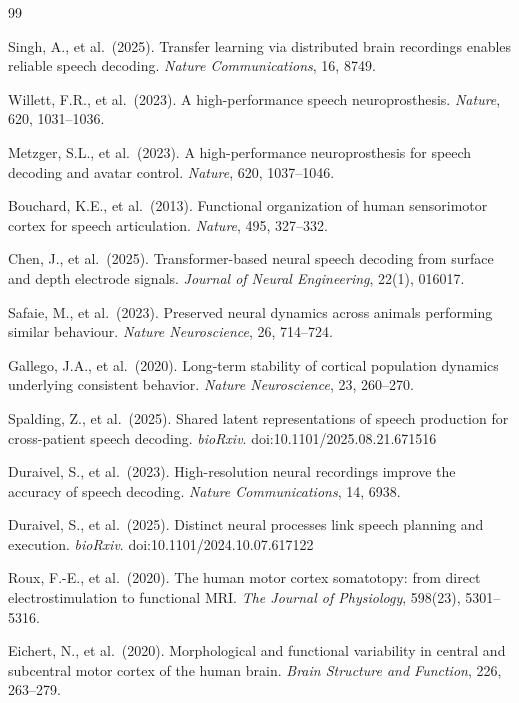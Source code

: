 \documentclass[11pt,letterpaper]{article}
\begin{document}
\begin{thebibliography}{99}\raggedright

Singh, A., et al.\ (2025).
Transfer learning via distributed brain recordings enables reliable speech decoding.
\textit{Nature Communications}, 16, 8749.

Willett, F.R., et al.\ (2023).
A high-performance speech neuroprosthesis.
\textit{Nature}, 620, 1031--1036.

Metzger, S.L., et al.\ (2023).
A high-performance neuroprosthesis for speech decoding and avatar control.
\textit{Nature}, 620, 1037--1046.

Bouchard, K.E., et al.\ (2013).
Functional organization of human sensorimotor cortex for speech articulation.
\textit{Nature}, 495, 327--332.

Chen, J., et al.\ (2025).
Transformer-based neural speech decoding from surface and depth electrode signals.
\textit{Journal of Neural Engineering}, 22(1), 016017.

Safaie, M., et al.\ (2023).
Preserved neural dynamics across animals performing similar behaviour.
\textit{Nature Neuroscience}, 26, 714--724.

Gallego, J.A., et al.\ (2020).
Long-term stability of cortical population dynamics underlying consistent behavior.
\textit{Nature Neuroscience}, 23, 260--270.

Spalding, Z., et al.\ (2025).
Shared latent representations of speech production for cross-patient speech decoding.
\textit{bioRxiv}. doi:10.1101/2025.08.21.671516

Duraivel, S., et al.\ (2023).
High-resolution neural recordings improve the accuracy of speech decoding.
\textit{Nature Communications}, 14, 6938.

Duraivel, S., et al.\ (2025).
Distinct neural processes link speech planning and execution.
\textit{bioRxiv}. doi:10.1101/2024.10.07.617122

Roux, F.-E., et al.\ (2020).
The human motor cortex somatotopy: from direct electrostimulation to functional MRI.
\textit{The Journal of Physiology}, 598(23), 5301--5316.

Eichert, N., et al.\ (2020).
Morphological and functional variability in central and subcentral motor cortex of the human brain.
\textit{Brain Structure and Function}, 226, 263--279.


\end{thebibliography}
\end{document}

